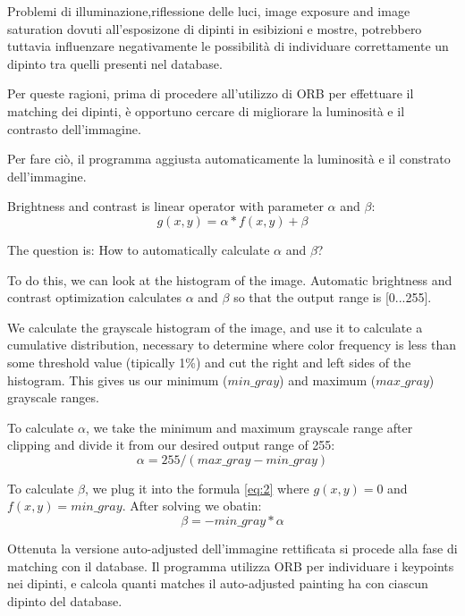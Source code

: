 \documentclass[10pt,twocolumn,letterpaper]{article}
\begin{document}
Problemi di illuminazione,riflessione delle luci, image exposure and image saturation dovuti all'esposizone di dipinti in esibizioni e mostre, potrebbero tuttavia influenzare negativamente le possibilità di individuare correttamente un dipinto tra quelli presenti nel database. 

Per queste ragioni, prima di procedere all'utilizzo di ORB per effettuare il matching dei dipinti, è opportuno cercare di migliorare la luminosità e il contrasto dell'immagine.

Per fare ciò, il programma aggiusta automaticamente la luminosità e il constrato dell'immagine.

Brightness and contrast is linear operator with parameter $\alpha$ and $\beta$:
\begin{equation} 
   g(x,y)= \alpha * f(x,y)+ \beta 
   \label{eq:2}
\end{equation}

The question is: How to automatically calculate $\alpha$ and $\beta$?

To do this, we can look at the histogram of the image. Automatic brightness and contrast optimization calculates $\alpha$ and $\beta$ so that the output range is [0...255]. 

We calculate the grayscale histogram of the image, and use it to calculate a cumulative distribution, necessary to determine where color frequency is less than some threshold value (tipically 1\%) and cut the right and left sides of the histogram. This gives us our minimum ($min\_gray$) and maximum ($max\_gray$) grayscale ranges.

To calculate $\alpha$, we take the minimum and maximum grayscale range after clipping and divide it from our desired output range of 255:
\begin{equation} 
   \alpha = 255 / (max\_gray - min\_gray)
   \label{eq:3}
\end{equation}

To calculate $\beta$, we plug it into the formula \ref{eq:2} where $g(x, y)=0$ and $f(x, y)=min\_gray$. After solving we obatin:
\begin{equation} 
   \beta = -min\_gray * \alpha
   \label{eq:4}
\end{equation}

Ottenuta la versione auto-adjusted dell'immagine rettificata si procede alla fase di matching con il database. Il programma utilizza ORB per individuare i keypoints nei dipinti, e calcola quanti matches il auto-adjusted painting ha con ciascun dipinto del database.
\end{document}
